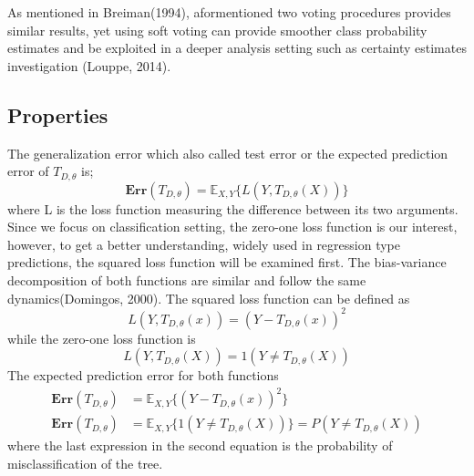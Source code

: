 As mentioned in Breiman(1994), aformentioned two voting procedures provides similar results, yet using soft voting can provide smoother class probability estimates and be exploited in a deeper analysis setting such as certainty estimates investigation (Louppe, 2014). 

\subsection{Properties}

The generalization error which also called test error or the expected prediction error of $T_{D,\theta}$ is;
\begin{equation}
\boldsymbol{Err}(T_{D,\theta}) = \mathbb{E}_{X,Y}\{L(Y, T_{D,\theta}(X)) \}
\end{equation}
where L is the loss function measuring the difference between its two arguments. Since we focus on classification setting, the zero-one loss function is our interest, however, to get a better understanding, widely used in regression type predictions, the squared loss function will be examined first. The bias-variance decomposition of both functions are similar and follow the same dynamics(Domingos, 2000). The squared loss function can be defined as
\begin{equation}
L(Y, T_{D, \theta}(x)) = (Y - T_{D, \theta}(x))^2
\end{equation}
while the zero-one loss function is
\begin{equation}
L(Y, T_{D,\theta}(X)) = 1 (Y \neq T_{D, \theta}(X))
\end{equation}
The expected prediction error for both functions 
\begin{align}
\boldsymbol{Err}(T_{D,\theta}) & = \mathbb{E}_{X,Y}\{ (Y - T_{D, \theta}(x))^2 \} \\
\boldsymbol{Err}(T_{D,\theta}) & = \mathbb{E}_{X,Y}\{ 1(Y \neq T_{D, \theta}(X)) \}
= P(Y \neq T_{D, \theta}(X))
\end{align}
where the last expression in the second equation is the probability of misclassification of the tree.

